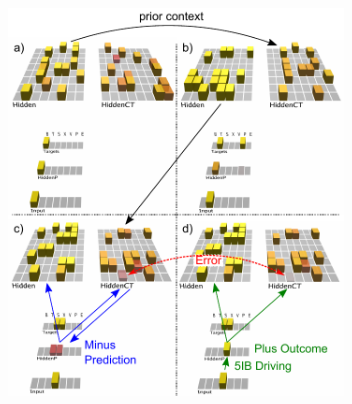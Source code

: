\documentclass[11pt,twoside]{article}
\newif\myifpdf
\begin{document}
\begin{figure}
  \centering\includegraphics[width=3.5in]{fig_deepleabra_fsa_net_3steps}

\end{figure}
\end{document}
